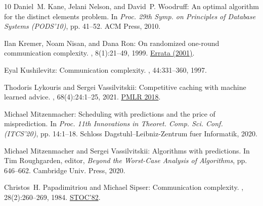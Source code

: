 \documentclass[11pt]{article}
\numberwithin{equation}{section}
\theoremstyle{definition}
\theoremstyle{plain}
\begin{document}
\begin{thebibliography}{10}
{\sc Daniel~M. Kane, Jelani Nelson, and David~P. Woodruff}: An optimal
  algorithm for the distinct elements problem.
\newblock In {\em Proc. 29th Symp. on Principles of Database Systems
  (PODS'10)}, pp. 41--52. ACM Press, 2010.
\newblock [\epfmtdoi{10.1145/1807085.1807094}]

{\sc Ilan Kremer, Noam Nisan, and Dana Ron}: On randomized one-round
  communication complexity.
, 8(1):21--49, 1999.
\newblock \href{https://doi.org/10.1007/s000370100003}{Errata (2001)}.
\newblock [\epfmtdoi{10.1007/s000370050018}]

{\sc Eyal Kushilevitz}: Communication complexity.
, 44:331--360, 1997.
\newblock [\epfmtdoi{10.1016/S0065-2458(08)60342-3}]

{\sc Thodoris Lykouris and Sergei Vassilvitskii}: Competitive caching with
  machine learned advice.
, 68(4):24:1--25, 2021.
\newblock \prelim
  \href{https://proceedings.mlr.press/v80/lykouris18a.html}{PMLR 2018}.

{\sc Michael Mitzenmacher}: Scheduling with predictions and the price of
  misprediction.
\newblock In {\em Proc. 11th Innovations in Theoret. Comp. Sci. Conf.
  (ITCS'20)}, pp. 14:1--18. Schloss Dagstuhl--Leibniz-Zentrum fuer Informatik,
  2020.

{\sc Michael Mitzenmacher and Sergei Vassilvitskii}: Algorithms with
  predictions.
\newblock In {\sc Tim Roughgarden}, editor, {\em Beyond the Worst-Case Analysis
  of Algorithms}, pp. 646--662. Cambridge Univ. Press, 2020.
\newblock [\epfmtdoi{10.1017/9781108637435.037}]

{\sc Christos~H. Papadimitriou and Michael Sipser}: Communication complexity.
, 28(2):260--269, 1984.
\newblock \prelim \href{https://doi.org/10.1145/800070.802192}{STOC'82}.
\newblock [\epfmtdoi{10.1016/0022-0000(84)90069-2}]


\end{thebibliography}
\end{document}
